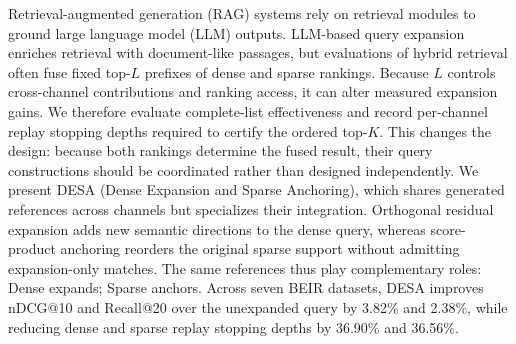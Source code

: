 Retrieval-augmented generation (RAG) systems rely on retrieval modules to ground large language model (LLM) outputs. LLM-based query expansion enriches retrieval with document-like passages, but evaluations of hybrid retrieval often fuse fixed top-\(L\) prefixes of dense and sparse rankings. Because \(L\) controls cross-channel contributions and ranking access, it can alter measured expansion gains. We therefore evaluate complete-list effectiveness and record per-channel replay stopping depths required to certify the ordered top-\(K\). This changes the design: because both rankings determine the fused result, their query constructions should be coordinated rather than designed independently. We present DESA (Dense Expansion and Sparse Anchoring), which shares generated references across channels but specializes their integration. Orthogonal residual expansion adds new semantic directions to the dense query, whereas score-product anchoring reorders the original sparse support without admitting expansion-only matches. The same references thus play complementary roles: Dense expands; Sparse anchors. Across seven BEIR datasets, DESA improves nDCG@10 and Recall@20 over the unexpanded query by 3.82\% and 2.38\%, while reducing dense and sparse replay stopping depths by 36.90\% and 36.56\%.
